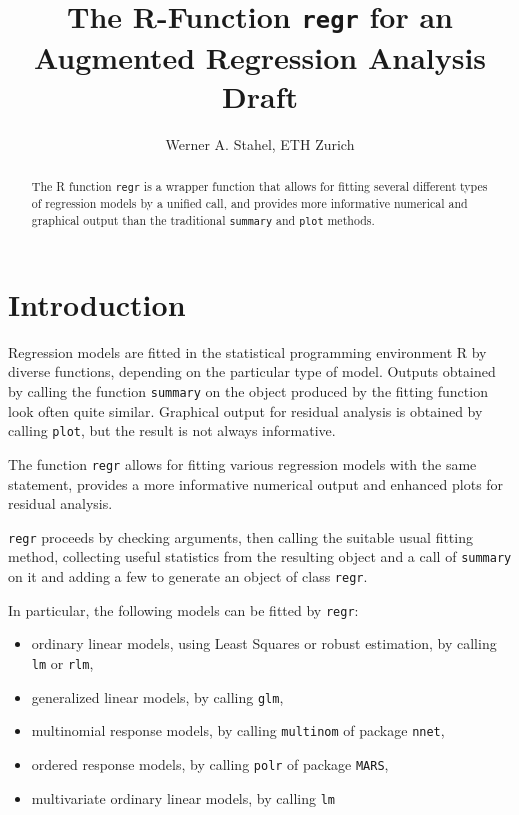 \documentclass{article}
\providecommand{\T}{\texttt}
\begin{document}
\title{The R-Function \T{regr} for an Augmented Regression Analysis\\
Draft}
\author{Werner A. Stahel, ETH Zurich}
\maketitle

\begin{abstract}
The R function \T{regr} is a wrapper function that allows for fitting
several different types of regression models by a unified call, and
provides more informative numerical and graphical output than the 
traditional \T{summary} and \T{plot} methods.
\end{abstract}

\section{Introduction}

Regression models are fitted in the statistical programming environment R 
by diverse functions, depending on the particular type of model.
Outputs obtained by calling the function \T{summary} on the object produced
by the fitting function look often quite similar. Graphical output for
residual analysis is obtained by calling \T{plot}, but the result is not
always informative. 

The function \T{regr} allows for fitting various regression models
with the same statement, provides a more informative numerical output
and enhanced plots for residual analysis. 

\T{regr} proceeds by 
checking arguments, then calling the suitable usual fitting method,
collecting useful statistics from the resulting object and a call of 
\T{summary} on it and adding a few to generate an object of class
\T{regr}. 


In particular, the following models can be fitted by \T{regr}:
\begin{itemize}
\item 
  ordinary linear models, using Least Squares or robust estimation,
  by calling \T{lm} or \T{rlm},
\item
  generalized linear models, by calling \T{glm},
\item
  multinomial response models, by calling \T{multinom} of package
  \T{nnet},
\item
  ordered response models, by calling \T{polr} of package
  \T{MARS},
\item
  multivariate ordinary linear models, by calling \T{lm}
\end{itemize}
\end{document}
